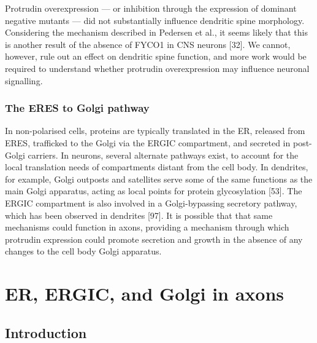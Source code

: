 \documentclass[
  12pt,
  a4paper,
]{book}
\renewcommand{\chaptermark}[1]{\markboth{#1}{}}
\begin{document}
Protrudin overexpression --- or inhibition through the expression of dominant negative mutants --- did not substantially influence dendritic spine morphology. Considering the mechanism described in Pedersen et al., it seems likely that this is another result of the absence of FYCO1 in CNS neurons {[}32{]}. We cannot, however, rule out an effect on dendritic spine function, and more work would be required to understand whether protrudin overexpression may influence neuronal signalling.

\hypertarget{the-eres-to-golgi-pathway}{%
\subsection{The ERES to Golgi pathway}\label{the-eres-to-golgi-pathway}}

In non-polarised cells, proteins are typically translated in the ER, released from ERES, trafficked to the Golgi via the ERGIC compartment, and secreted in post-Golgi carriers. In neurons, several alternate pathways exist, to account for the local translation needs of compartments distant from the cell body. In dendrites, for example, Golgi outposts and satellites serve some of the same functions as the main Golgi apparatus, acting as local points for protein glycosylation {[}53{]}. The ERGIC compartment is also involved in a Golgi-bypassing secretory pathway, which has been observed in dendrites {[}97{]}. It is possible that that same mechanisms could function in axons, providing a mechanism through which protrudin expression could promote secretion and growth in the absence of any changes to the cell body Golgi apparatus.

\hypertarget{er-ergic-and-golgi-in-axons}{%
\chapter{ER, ERGIC, and Golgi in axons}\label{er-ergic-and-golgi-in-axons}}

\chaptermark{ER, ERGIC, and Golgi}

\hypertarget{introduction-2}{%
\section{Introduction}\label{introduction-2}}
\end{document}
